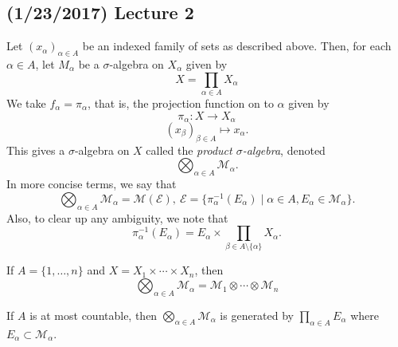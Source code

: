\documentclass[11pt,leqno,oneside]{amsbook}
\numberwithin{thm}{section}
\newcommand{\M}{\mathcal{M}}
\newcommand{\Ep}{\mathcal{E}}
\begin{document}
\subsection*{(1/23/2017) Lecture 2}
\begin{example}
  Let $(x_\alpha)_{\alpha \in A}$ be an indexed family of sets as
  described above. Then, for each $\alpha \in A$, let $M_\alpha$ be a
  $\sigma$-algebra on $X_\alpha$ given by \[
    X = \prod_{\alpha \in A} X_\alpha
  \]
  We take $f_\alpha = \pi_\alpha$, that is, the projection function on
  to $\alpha$ given by \[
    \pi_\alpha: X \to X_\alpha 
  \] \[
    (x_\beta)_{\beta \in A} \mapsto x_\alpha.
  \]
  This gives a $\sigma$-algebra on $X$ called the \emph{product
    $\sigma$-algebra}, denoted \[
    \bigotimes_{\alpha \in A} \M_\alpha.
  \]
  In more concise terms, we say that \[
    \bigotimes_{\alpha \in A} \M_\alpha = \M(\Ep), \ \Ep =
    \{\pi_{\alpha}^{-1}(E_\alpha) \mid \alpha \in A, E_\alpha \in
    \M_\alpha \}.
  \]
  Also, to clear up any ambiguity, we note that \[
    \pi_\alpha^{-1}(E_\alpha) = E_\alpha \times \prod_{\beta \in A
      \setminus \{\alpha\}} X_\alpha.
  \]
\end{example}
\begin{example}
  If $A = \{1, \ldots, n\}$ and $X = X_1 \times \cdots \times X_n$,
  then \[
    \bigotimes_{\alpha \in A} \M_\alpha = \M_1 \otimes \cdots \otimes \M_n
  \]
\end{example}
\begin{prop}
  If $A$ is at most countable, then $\bigotimes_{\alpha \in A}
  \M_\alpha$ is generated by $\prod_{\alpha \in A} E_\alpha$ where
  $E_\alpha \subset \M_\alpha$. 
\end{prop}
\end{document}
